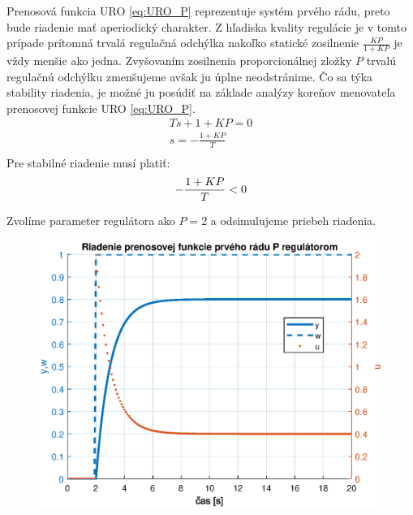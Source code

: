 \documentclass[a4paper,10pt]{article}
\begin{document}
Prenosová funkcia URO \eqref{eq:URO_P} reprezentuje systém prvého rádu, preto bude riadenie mať aperiodický charakter. Z hľadiska kvality regulácie je v tomto prípade prítomná trvalá regulačná odchýlka nakoľko statické zosilnenie $\frac{KP}{1+KP}$ je vždy menšie ako jedna.
Zvyšovaním zosilnenia proporcionálnej zložky $P$ trvalú regulačnú odchýlku zmenšujeme  avšak ju úplne neodstránime.
Čo sa týka stability riadenia, je možné ju posúdiť na základe analýzy koreňov menovateľa prenosovej funkcie URO \eqref{eq:URO_P}.  
\begin{equation}
\begin{array}{l}
 	Ts+1+KP=0 \\
 	s=-\frac{1+KP}{T}\\
\end{array}	
\end{equation}
Pre stabilné riadenie musí platiť:
\begin{equation}
-\frac{1+KP}{T}<0\\
\end{equation}

Zvolíme parameter regulátora ako $P=2$ a odsimulujeme priebeh riadenia.

\begin{figure}[ht]
\centering
\includegraphics[scale=0.55]{P_control}
\end{figure}
\end{document}
